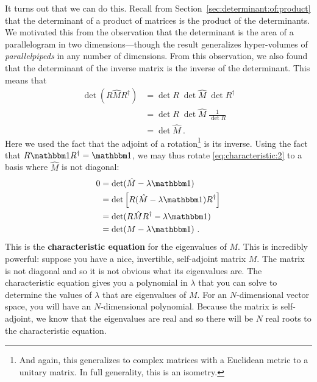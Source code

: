 \documentclass[12pt, oneside]{report}    %
\begin{document}
It turns out that we can do this. Recall from Section~\ref{sec:determinant:of:product} that the determinant of a product of matrices is the product of the determinants. We motivated this from the observation that the determinant is the area of a parallelogram in two dimensions---though the result generalizes hyper-volumes of \emph{parallelpipeds} in any number of dimensions. From this observation, we also found that the determinant of the inverse matrix is the inverse of the determinant. This means that
\begin{align}
    \det(R\hat M R^\dag) &= 
    \det R \; \det \hat M \; \det R^\dag
    \\&
    =
    \det R \; \det \hat M \; \frac{1}{\det R}
    \\&
    =
    \det \hat M \ .
\end{align}
Here we used the fact that the adjoint of a rotation\footnote{And again, this generalizes to complex matrices with a Euclidean metric to a unitary matrix. In full generality, this is an isometry.} is its inverse. Using the fact that $R\one R^\dag = \one$, we may thus rotate \eqref{eq:characteristic:2} to a basis where $\hat M$ is not diagonal:
\begin{align}
     0&=\det(\hat M - \lambda \one) 
     \\
     &= \det\left[R(\hat M - \lambda \one)R^\dag\right]
     \\
     &= \det(R\hat M R^\dag - \lambda \one) 
     \\
     &= \det(M - \lambda \one) 
     \label{eq:characteristic:equation} \ .
\end{align}
This is the \textbf{characteristic equation} for the eigenvalues of $M$. This is incredibly powerful: suppose you have a nice, invertible, self-adjoint matrix $M$. The matrix is not diagonal and so it is not obvious what its eigenvalues are. The characteristic equation gives you a polynomial in $\lambda$ that you can solve to determine the values of $\lambda$ that are eigenvalues of $M$. For an $N$-dimensional vector space, you will have an $N$-dimensional polynomial. Because the matrix is self-adjoint, we know that the eigenvalues are real and so there will be $N$ real roots to the characteristic equation.
\end{document}
